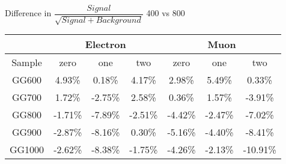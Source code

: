 \begin{frame}{Difference in $\dfrac{Signal}{\sqrt{Signal + Background}}$ 400 vs 800}
\begin{center}
  \begin{tabular}{ | c | c | c | c | c | c | c |}
    \hline
    & \multicolumn{3}{|c|}{Electron} & \multicolumn{3}{|c|}{Muon}\\ \hline
    Sample  & zero& one  & two  & zero & one  & two  \\ \hline \hline

GG600 & 4.93\% & 0.18\% & 4.17\% & 2.98\% & 5.49\% & 0.33\% \\ \hline
GG700 & 1.72\% & -2.75\% & 2.58\% & 0.36\% & 1.57\% & -3.91\% \\ \hline
GG800 & -1.71\% & -7.89\% & -2.51\% & -4.42\% & -2.47\% & -7.02\% \\ \hline
GG900 & -2.87\% & -8.16\% & 0.30\% & -5.16\% & -4.40\% & -8.41\% \\ \hline
GG1000 & -2.62\% & -8.38\% & -1.75\% & -4.26\% & -2.13\% & -10.91\% \\ \hline

\end{tabular}
\end{center}

\end{frame}
